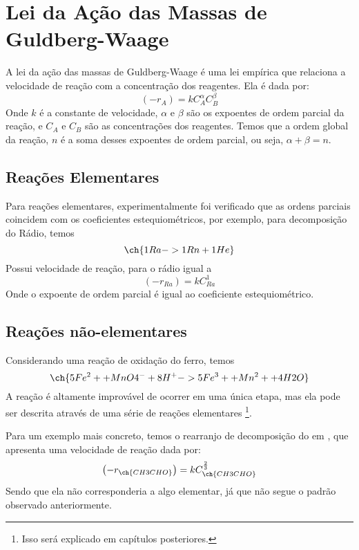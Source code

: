 \section{Lei da Ação das Massas de Guldberg-Waage}
A lei da ação das massas de Guldberg-Waage é uma lei empírica que relaciona a velocidade de reação
com a concentração dos reagentes. Ela é dada por:
\begin{equation}
    \left( -r_A \right) = k C_A^{\alpha}C_B^{\beta}
\end{equation}
Onde \(k\) é a constante de velocidade, \(\alpha\) e \(\beta\) são os expoentes de ordem parcial
da reação, e \(C_A\) e \(C_B\) são as concentrações dos reagentes. Temos que a ordem global da reação,
\(n\) é a soma desses expoentes de ordem parcial, ou seja, \(\alpha + \beta = n\). \par

\subsection{Reações Elementares}
Para reações elementares, experimentalmente foi verificado que as ordens parciais coincidem com os
coeficientes estequiométricos, por exemplo, para decomposição do Rádio, temos
\[
\ch{1Ra -> 1Rn + 1He}
\]
Possui velocidade de reação, para o rádio igual a 
\begin{equation}
    \left( -r_{Ra} \right) = k C_{Ra}^1
\end{equation}
Onde o expoente de ordem parcial é igual ao coeficiente estequiométrico. \par
\subsection{Reações não-elementares}
Considerando uma reação de oxidação do ferro, temos
\[
\ch{5Fe^2+ + MnO4^- + 8H^+ -> 5Fe^3+ + Mn^2+ + 4H2O} 
\]
A reação é altamente improvável de ocorrer em uma única etapa, mas ela pode ser descrita através de
uma série de reações elementares \footnote{Isso será explicado em capítulos posteriores.}. \par

Para um exemplo mais concreto, temos o rearranjo de decomposição do  em , que
apresenta uma velocidade de reação dada por:
\[
\left( - r_{\ch{CH3CHO}} \right) = k C_{\ch{CH3CHO}}^{\frac{2}{3}}
\] 
Sendo que ela não corresponderia a algo elementar, já que não segue o padrão observado
anteriormente. \par

